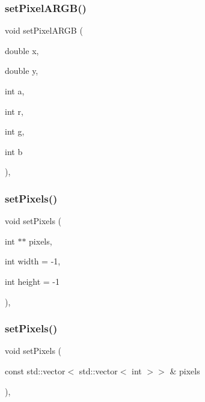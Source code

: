 \subsubsection{\texorpdfstring{set\+Pixel\+A\+R\+G\+B()}{setPixelARGB()}\hspace{0.1cm}{\footnotesize\ttfamily [2/2]}}
{\footnotesize\ttfamily void set\+Pixel\+A\+R\+GB (\begin{DoxyParamCaption}\item[{double}]{x,  }\item[{double}]{y,  }\item[{int}]{a,  }\item[{int}]{r,  }\item[{int}]{g,  }\item[{int}]{b }\end{DoxyParamCaption})\hspace{0.3cm}{\ttfamily [override]}, {\ttfamily [inherited]}}

\mbox{\label{classsgl_1_1GForwardDrawingSurface_a9c29e6db2b5cae836612d932f7ef7146}} 
\subsubsection{\texorpdfstring{set\+Pixels()}{setPixels()}\hspace{0.1cm}{\footnotesize\ttfamily [1/2]}}
{\footnotesize\ttfamily void set\+Pixels (\begin{DoxyParamCaption}\item[{int $\ast$$\ast$}]{pixels,  }\item[{int}]{width = {\ttfamily -\/1},  }\item[{int}]{height = {\ttfamily -\/1} }\end{DoxyParamCaption})\hspace{0.3cm}{\ttfamily [override]}, {\ttfamily [inherited]}}

\mbox{\label{classsgl_1_1GForwardDrawingSurface_afa5e481700ddb87860c4efd815db9ab2}} 
\subsubsection{\texorpdfstring{set\+Pixels()}{setPixels()}\hspace{0.1cm}{\footnotesize\ttfamily [2/2]}}
{\footnotesize\ttfamily void set\+Pixels (\begin{DoxyParamCaption}\item[{const std\+::vector$<$ std\+::vector$<$ int $>$$>$ \&}]{pixels }\end{DoxyParamCaption})\hspace{0.3cm}{\ttfamily [override]}, {\ttfamily [inherited]}}

